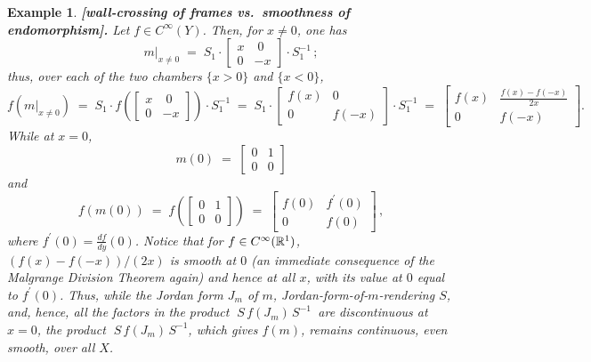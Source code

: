\documentclass[11pt]{article}
\numberwithin{equation}{subsection}
\newtheorem{sexample}[stheorem]{Example}
\begin{document}
\begin{sexample} {\bf [wall-crossing of frames vs.\ smoothness of endomorphism].}
Let $f\in C^{\infty}(Y)$.
Then,
  for $x\ne 0$, one has
   $$
     m|_{x\ne 0}\;
	     =\;  S_1  \cdot
	                         \left[\begin{array}{cc} x & \;0 \\ 0 & -x\end{array}\right]
							 \cdot S_1^{-1}\,;
   $$
 thus, over each of the two chambers $\{x>0\}$  and $\{x<0\}$,
  $$
    f(m|_{x\ne 0})\;
	  =\;  S_1\cdot
                          f\left(\left[
                                         \begin{array}{cc} x & \;0 \\ 0 & -x \end{array}			
			                 \right]\right)
  	                      \cdot S_1^{-1}\;
      =\;S_1\cdot
                       \left[
                           \begin{array}{cc} f(x) & 0 \\ 0 & f(-x) \end{array}			
			           \right]
  	                 \cdot S_1^{-1}\;       						
      =\; \left[
	         \begin{array}{cc}
			    f(x) &  \frac{f(x)-f(-x)}{2x}\\
			    0 & f(-x)
			 \end{array}
            \right].
  $$
  While at $x=0$,
  $$
     m(0)\;=\; \left[ \begin{array}{cc} 0 & 1 \\ 0 & 0 \end{array}\right]
  $$
  and
  $$
   f(m(0))\;
    =\; f\left( \left[\begin{array}{cc} 0 & 1 \\ 0 & 0\end{array}\right] \right)\;
	=\; \left[\begin{array}{cc} f(0) & f^{\prime}(0) \\ 0 & f(0)    \end{array}\right]\,,
  $$
  where $f^{\prime}(0)=\frac{df}{dy}(0)$.
 Notice that for $f\in C^{\infty}({\Bbb R}^1)$,
  $( f(x)- f(-x)  )/(2x)$ is smooth at $0$
  (an immediate consequence of the Malgrange Division Theorem again) and hence at all $x$,
  with its value at $0$ equal to $f^{\prime}(0)$.
 Thus,
  while the Jordan form $J_m$  of $m$, Jordan-form-of-$m$-rendering $S$,
   and, hence, all the factors in the product $\;S\,f(J_m)\,S ^{-1}\,$
   are discontinuous at $x=0$,
  the product $\;S\,f(J_m)\,S ^{-1}$, which gives $f(m)$,
  remains continuous, even smooth, over all $X$.

\end{sexample}
\end{document}

